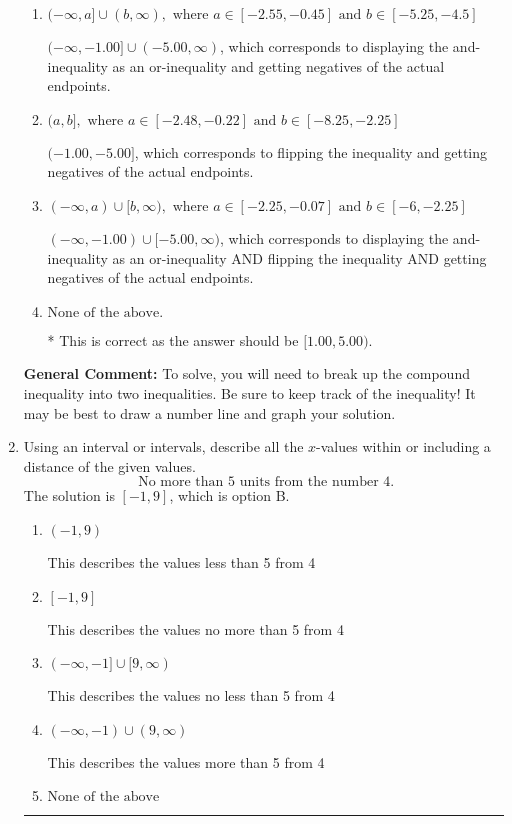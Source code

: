 \documentclass{extbook}[14pt]
\newcommand{\litem}[1]{\item #1

\rule{\textwidth}{0.4pt}}
\begin{document}
\begin{enumerate}
{\begin{enumerate}[label=\Alph*.]
$[-1.00, -5.00)$, which is the correct interval but negatives of the actual endpoints.
\item \( (-\infty, a] \cup (b, \infty), \text{ where } a \in [-2.55, -0.45] \text{ and } b \in [-5.25, -4.5] \)

$(-\infty, -1.00] \cup (-5.00, \infty)$, which corresponds to displaying the and-inequality as an or-inequality and getting negatives of the actual endpoints.
\item \( (a, b], \text{ where } a \in [-2.48, -0.22] \text{ and } b \in [-8.25, -2.25] \)

$(-1.00, -5.00]$, which corresponds to flipping the inequality and getting negatives of the actual endpoints.
\item \( (-\infty, a) \cup [b, \infty), \text{ where } a \in [-2.25, -0.07] \text{ and } b \in [-6, -2.25] \)

$(-\infty, -1.00) \cup [-5.00, \infty)$, which corresponds to displaying the and-inequality as an or-inequality AND flipping the inequality AND getting negatives of the actual endpoints.
\item \( \text{None of the above.} \)

* This is correct as the answer should be $[1.00, 5.00)$.
\end{enumerate}

\textbf{General Comment:} To solve, you will need to break up the compound inequality into two inequalities. Be sure to keep track of the inequality! It may be best to draw a number line and graph your solution.
}
\litem{
Using an interval or intervals, describe all the $x$-values within or including a distance of the given values.
\[ \text{ No more than } 5 \text{ units from the number } 4. \]The solution is \( [-1, 9] \), which is option B.\begin{enumerate}[label=\Alph*.]
\item \( (-1, 9) \)

This describes the values less than 5 from 4
\item \( [-1, 9] \)

This describes the values no more than 5 from 4
\item \( (-\infty, -1] \cup [9, \infty) \)

This describes the values no less than 5 from 4
\item \( (-\infty, -1) \cup (9, \infty) \)

This describes the values more than 5 from 4
\item \( \text{None of the above} \)


\end{enumerate}}
\end{enumerate}
\end{document}
